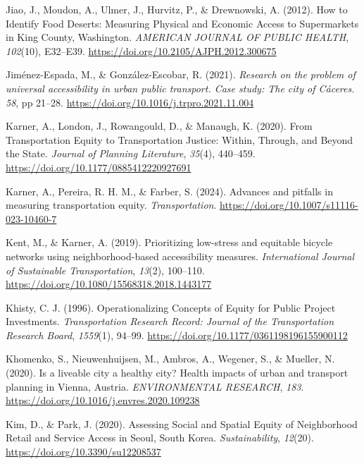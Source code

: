 \documentclass[
  letterpaper,
  DIV=11,
  numbers=noendperiod]{scrartcl}
\newlength{\cslhangindent}
\newenvironment{CSLReferences}[2] %
 {\begin{list}{}{%
  \setlength{\itemindent}{0pt}
  \setlength{\leftmargin}{0pt}
  \setlength{\parsep}{0pt}
  \ifodd #1
   \setlength{\leftmargin}{\cslhangindent}
   \setlength{\itemindent}{-1\cslhangindent}
  \fi
  \setlength{\itemsep}{#2\baselineskip}}}
 {\end{list}}
\begin{document}
\begin{CSLReferences}{1}{0}
Jiao, J., Moudon, A., Ulmer, J., Hurvitz, P., \& Drewnowski, A. (2012).
How to {Identify Food Deserts}: {Measuring Physical} and {Economic
Access} to {Supermarkets} in {King County}, {Washington}. \emph{AMERICAN
JOURNAL OF PUBLIC HEALTH}, \emph{102}(10), E32--E39.
\url{https://doi.org/10.2105/AJPH.2012.300675}

Jiménez-Espada, M., \& González-Escobar, R. (2021). \emph{Research on
the problem of universal accessibility in urban public transport. {Case}
study: The city of {Cáceres}.} \emph{58}, pp 21--28.
\url{https://doi.org/10.1016/j.trpro.2021.11.004}

Karner, A., London, J., Rowangould, D., \& Manaugh, K. (2020). From
{Transportation Equity} to {Transportation Justice}: {Within},
{Through}, and {Beyond} the {State}. \emph{Journal of Planning
Literature}, \emph{35}(4), 440--459.
\url{https://doi.org/10.1177/0885412220927691}

Karner, A., Pereira, R. H. M., \& Farber, S. (2024). Advances and
pitfalls in measuring transportation equity. \emph{Transportation}.
\url{https://doi.org/10.1007/s11116-023-10460-7}

Kent, M., \& Karner, A. (2019). Prioritizing low-stress and equitable
bicycle networks using neighborhood-based accessibility measures.
\emph{International Journal of Sustainable Transportation},
\emph{13}(2), 100--110.
\url{https://doi.org/10.1080/15568318.2018.1443177}

Khisty, C. J. (1996). Operationalizing {Concepts} of {Equity} for
{Public Project Investments}. \emph{Transportation Research Record:
Journal of the Transportation Research Board}, \emph{1559}(1), 94--99.
\url{https://doi.org/10.1177/0361198196155900112}

Khomenko, S., Nieuwenhuijsen, M., Ambros, A., Wegener, S., \& Mueller,
N. (2020). Is a liveable city a healthy city? {Health} impacts of urban
and transport planning in {Vienna}, {Austria}. \emph{ENVIRONMENTAL
RESEARCH}, \emph{183}.
\url{https://doi.org/10.1016/j.envres.2020.109238}

Kim, D., \& Park, J. (2020). Assessing {Social} and {Spatial Equity} of
{Neighborhood Retail} and {Service Access} in {Seoul}, {South Korea}.
\emph{Sustainability}, \emph{12}(20).
\url{https://doi.org/10.3390/su12208537}


\end{CSLReferences}
\end{document}
